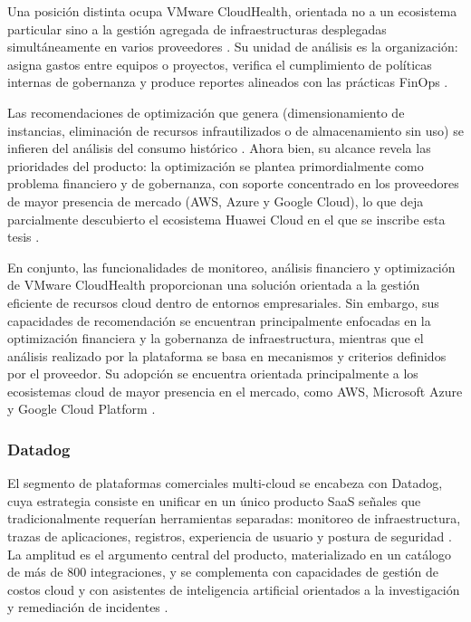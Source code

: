 Una posición distinta ocupa VMware CloudHealth, orientada no a un ecosistema particular sino a la gestión agregada de infraestructuras desplegadas simultáneamente en varios proveedores \parencite{VMware2023}. Su unidad de análisis es la organización: asigna gastos entre equipos o proyectos, verifica el cumplimiento de políticas internas de gobernanza y produce reportes alineados con las prácticas FinOps \parencite{VMware2023}.

Las recomendaciones de optimización que genera (dimensionamiento de instancias, eliminación de recursos infrautilizados o de almacenamiento sin uso) se infieren del análisis del consumo histórico \parencite{VMware2023}. Ahora bien, su alcance revela las prioridades del producto: la optimización se plantea primordialmente como problema financiero y de gobernanza, con soporte concentrado en los proveedores de mayor presencia de mercado (AWS, Azure y Google Cloud), lo que deja parcialmente descubierto el ecosistema Huawei Cloud en el que se inscribe esta tesis \parencite{VMware2023}.

En conjunto, las funcionalidades de monitoreo, análisis financiero y optimización de VMware CloudHealth proporcionan una solución orientada a la gestión eficiente de recursos cloud dentro de entornos empresariales. Sin embargo, sus capacidades de recomendación se encuentran principalmente enfocadas en la optimización financiera y la gobernanza de infraestructura, mientras que el análisis realizado por la plataforma se basa en mecanismos y criterios definidos por el proveedor. Su adopción se encuentra orientada principalmente a los ecosistemas cloud de mayor presencia en el mercado, como AWS, Microsoft Azure y Google Cloud Platform \parencite{VMware2023}.

\subsubsection{Datadog}

El segmento de plataformas comerciales multi-cloud se encabeza con Datadog, cuya estrategia consiste en unificar en un único producto SaaS señales que tradicionalmente requerían herramientas separadas: monitoreo de infraestructura, trazas de aplicaciones, registros, experiencia de usuario y postura de seguridad \parencite{Datadog2026}. La amplitud es el argumento central del producto, materializado en un catálogo de más de 800 integraciones, y se complementa con capacidades de gestión de costos cloud y con asistentes de inteligencia artificial orientados a la investigación y remediación de incidentes \parencite{Datadog2026}.


